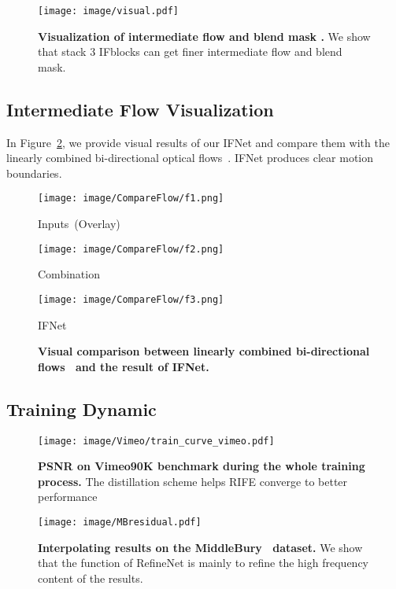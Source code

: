 \documentclass[final]{cvpr}
\begin{document}
\begin{figure}[h]
	\centering
	\texttt{[image: image/visual.pdf]}
	\caption{\textbf{Visualization of intermediate flow  and blend mask .} We show that stack 3 IFblocks can get finer intermediate flow and blend mask.  }\label{fig:mb}
\end{figure}

\subsection{Intermediate Flow Visualization}
In Figure~\ref{fig:compare_flow}, we provide visual results of our IFNet and compare them with the linearly combined bi-directional optical flows~\cite{jiang2018super}. IFNet produces clear motion boundaries.

\begin{figure}[h]
	\centering
	\begin{minipage}[t]{0.325\linewidth}
		\centering
		\texttt{[image: image/CompareFlow/f1.png]}
		\centerline{Inputs~(Overlay)}
	\end{minipage}
	\begin{minipage}[t]{0.325\linewidth}
		\centering
		\texttt{[image: image/CompareFlow/f2.png]}
		\centerline{Combination}
	\end{minipage}
	\begin{minipage}[t]{0.325\linewidth}
		\centering
		\texttt{[image: image/CompareFlow/f3.png]}
		\centerline{IFNet}
	\end{minipage}
	
	\caption{\textbf{Visual comparison between linearly combined bi-directional flows~\cite{jiang2018super} and the result of IFNet.} }
	\label{fig:compare_flow}
	\vspace{-1em}
\end{figure}


\subsection{Training Dynamic}
\begin{figure}[ht]
	\centering
	\texttt{[image: image/Vimeo/train\_curve\_vimeo.pdf]}
	\caption{\textbf{PSNR on Vimeo90K benchmark during the whole training process. } The distillation scheme helps RIFE converge to better performance}\label{fig:dynamic}
\end{figure}

\begin{figure*}[t]
	\centering
	\texttt{[image: image/MBresidual.pdf]}
	\caption{\textbf{Interpolating results on the MiddleBury~\cite{baker2011database} dataset.} We show that the function of RefineNet is mainly to refine the high frequency content of the results.}\label{fig:mb}
\end{figure*}
\end{document}
